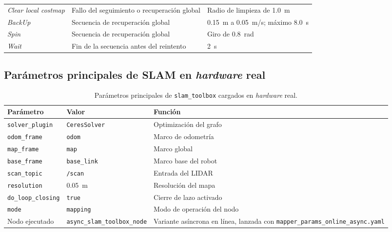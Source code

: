 \begin{appendices}
\begin{table}[H]
\begin{tabular}{p{3.6cm} p{4.8cm} p{5.2cm}}
\textit{Clear local costmap} &
Fallo del seguimiento o recuperación global &
Radio de limpieza de 1.0~m \\

\textit{BackUp} &
Secuencia de recuperación global &
0.15~m a 0.05~m/s; máximo 8.0~s \\

\textit{Spin} &
Secuencia de recuperación global &
Giro de 0.8~rad \\

\textit{Wait} &
Fin de la secuencia antes del reintento &
2~s \\
\bottomrule
\end{tabular}
\end{table}

\subsection{Parámetros principales de SLAM en \texorpdfstring{\textit{hardware}}{hardware} real}

\begin{table}[H]
\centering
\caption{Parámetros principales de \texttt{slam\_toolbox} cargados en \textit{hardware} real.}
\label{tab:slam_params_ch9}
\small
\begin{tabular}{p{3.5cm} p{3cm} p{5cm}}
\toprule
\textbf{Parámetro} & \textbf{Valor} & \textbf{Función} \\
\midrule
\texttt{solver\_plugin} & \texttt{CeresSolver} & Optimización del grafo \\
\texttt{odom\_frame} & \texttt{odom} & Marco de odometría \\
\texttt{map\_frame} & \texttt{map} & Marco global \\
\texttt{base\_frame} & \texttt{base\_link} & Marco base del robot \\
\texttt{scan\_topic} & \texttt{/scan} & Entrada del \gls{LIDAR} \\
\texttt{resolution} & 0.05~m & Resolución del mapa \\
\texttt{do\_loop\_closing} & \texttt{true} & Cierre de lazo activado \\
\texttt{mode} & \texttt{mapping} & Modo de operación del nodo \\
Nodo ejecutado & \texttt{async\_slam\_toolbox\_node} & Variante asíncrona en línea, lanzada con \texttt{mapper\_params\_online\_async.yaml} \\
\bottomrule
\end{tabular}
\end{table}


\end{appendices}
